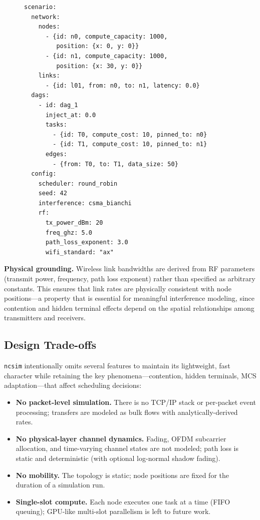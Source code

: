 \documentclass[conference]{IEEEtran}
\newcommand{\ncsim}{\texttt{ncsim}}
\begin{document}
\begin{figure}[t]
\begin{lstlisting}[language={},label={lst:yaml},
  caption={Minimal WiFi scenario (abridged).},
  morekeywords={scenario,network,nodes,links,dags,config,
    rf,id,position,from,to,tasks,edges,scheduler,
    interference,tx_power_dBm,freq_ghz,path_loss_exponent,
    wifi_standard,compute_capacity,compute_cost,
    data_size,inject_at,latency,pinned_to,seed}]
scenario:
  network:
    nodes:
      - {id: n0, compute_capacity: 1000,
         position: {x: 0, y: 0}}
      - {id: n1, compute_capacity: 1000,
         position: {x: 30, y: 0}}
    links:
      - {id: l01, from: n0, to: n1, latency: 0.0}
  dags:
    - id: dag_1
      inject_at: 0.0
      tasks:
        - {id: T0, compute_cost: 10, pinned_to: n0}
        - {id: T1, compute_cost: 10, pinned_to: n1}
      edges:
        - {from: T0, to: T1, data_size: 50}
  config:
    scheduler: round_robin
    seed: 42
    interference: csma_bianchi
    rf:
      tx_power_dBm: 20
      freq_ghz: 5.0
      path_loss_exponent: 3.0
      wifi_standard: "ax"
\end{lstlisting}
\end{figure}

\textbf{Physical grounding.}  Wireless link bandwidths are derived from RF
parameters (transmit power, frequency, path loss exponent) rather than
specified as arbitrary constants.  This ensures that link rates are
physically consistent with node positions---a property that is essential
for meaningful interference modeling, since contention and hidden terminal
effects depend on the spatial relationships among transmitters and receivers.

\subsection{Design Trade-offs}

\ncsim{} intentionally omits several features to maintain its lightweight,
fast character while retaining the key phenomena---contention, hidden
terminals, MCS adaptation---that affect scheduling decisions:

\begin{itemize}[itemsep=1pt,leftmargin=*]
\item \textbf{No packet-level simulation.}  There is no TCP/IP stack or
  per-packet event processing; transfers are modeled as bulk flows with
  analytically-derived rates.
\item \textbf{No physical-layer channel dynamics.}  Fading, OFDM subcarrier
  allocation, and time-varying channel states are not modeled; path loss is
  static and deterministic (with optional log-normal shadow fading).
\item \textbf{No mobility.}  The topology is static; node positions are fixed
  for the duration of a simulation run.
\item \textbf{Single-slot compute.}  Each node executes one task at a time
  (FIFO queuing); GPU-like multi-slot parallelism is left to future work.
\end{itemize}
\end{document}
